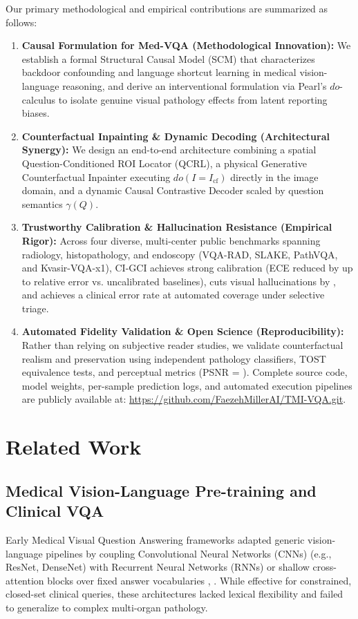 \documentclass[journal,twoside,web]{ieeecolor}
\begin{document}
Our primary methodological and empirical contributions are summarized as follows:
\begin{enumerate}
    \item \textbf{Causal Formulation for Med-VQA (Methodological Innovation):} We establish a formal Structural Causal Model (SCM) that characterizes backdoor confounding and language shortcut learning in medical vision-language reasoning, and derive an interventional formulation via Pearl's $do$-calculus to isolate genuine visual pathology effects from latent reporting biases.
    \item \textbf{Counterfactual Inpainting \& Dynamic Decoding (Architectural Synergy):} We design an end-to-end architecture combining a spatial Question-Conditioned ROI Locator (QCRL), a physical Generative Counterfactual Inpainter executing $do(I = I_{\text{cf}})$ directly in the image domain, and a dynamic Causal Contrastive Decoder scaled by question semantics $\gamma(Q)$.
    \item \textbf{Trustworthy Calibration \& Hallucination Resistance (Empirical Rigor):} Across four diverse, multi-center public benchmarks spanning radiology, histopathology, and endoscopy (VQA-RAD, SLAKE, PathVQA, and Kvasir-VQA-x1), CI-GCI achieves strong calibration (ECE reduced by up to \CanonEceRelReductionMax{} relative error vs. uncalibrated baselines), cuts visual hallucinations by \CanonHallucinationRelReduction{}, and achieves a \CanonRiskTauTwo{} clinical error rate at \CanonCoverageTauTwo{} automated coverage under selective triage.
    \item \textbf{Automated Fidelity Validation \& Open Science (Reproducibility):} Rather than relying on subjective reader studies, we validate counterfactual realism and preservation using independent pathology classifiers, TOST equivalence tests, and perceptual metrics (PSNR = \CanonFidelityPsnr{}). Complete source code, model weights, per-sample prediction logs, and automated execution pipelines are publicly available at: \url{https://github.com/FaezehMillerAI/TMI-VQA.git}.
\end{enumerate}

\section{Related Work}
\label{sec:related}

\subsection{Medical Vision-Language Pre-training and Clinical VQA}
Early Medical Visual Question Answering frameworks adapted generic vision-language pipelines by coupling Convolutional Neural Networks (CNNs) (e.g., ResNet, DenseNet) with Recurrent Neural Networks (RNNs) or shallow cross-attention blocks over fixed answer vocabularies \cite{nguyen2019}, \cite{lili2022}. While effective for constrained, closed-set clinical queries, these architectures lacked lexical flexibility and failed to generalize to complex multi-organ pathology.
\end{document}
